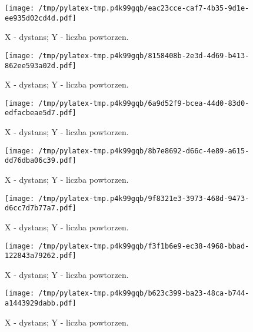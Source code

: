 \documentclass{article}%
\begin{document}
%
\newpage%


\begin{figure}[h]%
\centering%
\texttt{[image: /tmp/pylatex-tmp.p4k99gqb/eac23cce-caf7-4b35-9d1e-ee935d02cd4d.pdf]}%
\caption{X {-} dystans; Y {-} liczba powtorzen.}%
\end{figure}

%
\newpage%


\begin{figure}[h]%
\centering%
\texttt{[image: /tmp/pylatex-tmp.p4k99gqb/8158408b-2e3d-4d69-b413-862ee593a02d.pdf]}%
\caption{X {-} dystans; Y {-} liczba powtorzen.}%
\end{figure}

%
\newpage%


\begin{figure}[h]%
\centering%
\texttt{[image: /tmp/pylatex-tmp.p4k99gqb/6a9d52f9-bcea-44d0-83d0-edfacbeae5d7.pdf]}%
\caption{X {-} dystans; Y {-} liczba powtorzen.}%
\end{figure}

%
\newpage%


\begin{figure}[h]%
\centering%
\texttt{[image: /tmp/pylatex-tmp.p4k99gqb/8b7e8692-d66c-4e89-a615-dd76dba06c39.pdf]}%
\caption{X {-} dystans; Y {-} liczba powtorzen.}%
\end{figure}

%
\newpage%


\begin{figure}[h]%
\centering%
\texttt{[image: /tmp/pylatex-tmp.p4k99gqb/9f8321e3-3973-468d-9473-d6cc7d7b77a7.pdf]}%
\caption{X {-} dystans; Y {-} liczba powtorzen.}%
\end{figure}

%
\newpage%


\begin{figure}[h]%
\centering%
\texttt{[image: /tmp/pylatex-tmp.p4k99gqb/f3f1b6e9-ec38-4968-bbad-122843a79262.pdf]}%
\caption{X {-} dystans; Y {-} liczba powtorzen.}%
\end{figure}

%
\newpage%


\begin{figure}[h]%
\centering%
\texttt{[image: /tmp/pylatex-tmp.p4k99gqb/b623c399-ba23-48ca-b744-a1443929dabb.pdf]}%
\caption{X {-} dystans; Y {-} liczba powtorzen.}%
\end{figure}
\end{document}

